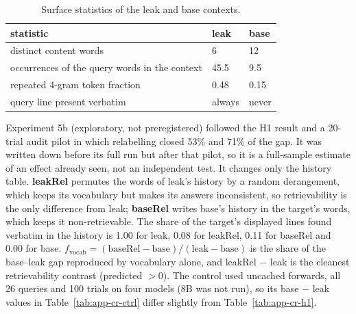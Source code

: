 \documentclass[11pt]{article}
\begin{document}
\begin{table}[tbp]
\centering
\small
\caption{Surface statistics of the leak and base contexts.}\label{tab:app-cr-surface}
\begin{tabular}{@{}lll@{}}
\toprule
statistic & leak & base \\
\midrule
distinct content words & 6 & 12 \\
occurrences of the query words in the context & 45.5 & 9.5 \\
repeated 4-gram token fraction & 0.48 & 0.15 \\
query line present verbatim & always & never \\
\bottomrule
\end{tabular}
\end{table}

Experiment 5b (exploratory, not preregistered) followed the H1 result and a 20-trial audit pilot in which relabelling closed 53\% and 71\% of the gap. It was written down before its full run but after that pilot, so it is a full-sample estimate of an effect already seen, not an independent test. It changes only the history table. \textbf{leakRel} permutes the words of leak's history by a random derangement, which keeps its vocabulary but makes its answers inconsistent, so retrievability is the only difference from leak; \textbf{baseRel} writes base's history in the target's words, which keeps it non-retrievable. The share of the target's displayed lines found verbatim in the history is 1.00 for leak, 0.08 for leakRel, 0.11 for baseRel and 0.00 for base. $f_{\mathrm{vocab}} = (\mathrm{baseRel} - \mathrm{base})/(\mathrm{leak} - \mathrm{base})$ is the share of the base--leak gap reproduced by vocabulary alone, and leakRel $-$ leak is the cleanest retrievability contrast (predicted $> 0$). The control used uncached forwards, all 26 queries and 100 trials on four models (8B was not run), so its base $-$ leak values in Table~\ref{tab:app-cr-ctrl} differ slightly from Table~\ref{tab:app-cr-h1}.
\end{document}
